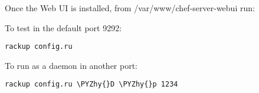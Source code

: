 Once the Web UI is installed, from /var/www/chef-server-webui run:

To test in the default port 9292:
\begin{codelisting}
\label{code:}
\codecaption{}
\begin{Verbatim}[fontsize=\relsize{-2.5},fontseries=b,commandchars=\\\{\}]
rackup config.ru
\end{Verbatim}
\end{codelisting}

To run as a daemon in another port:
\begin{codelisting}
\label{code:}
\codecaption{}
\begin{Verbatim}[fontsize=\relsize{-2.5},fontseries=b,commandchars=\\\{\}]
rackup config.ru \PYZhy{}D \PYZhy{}p 1234
\end{Verbatim}
\end{codelisting}